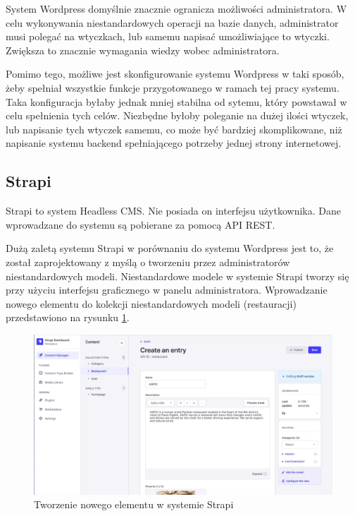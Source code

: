 System Wordpress domyślnie znacznie ogranicza możliwości administratora. W celu
wykonywania niestandardowych operacji na bazie danych, administrator musi
polegać na wtyczkach, lub samemu napisać umożliwiające to wtyczki. Zwiększa to
znacznie wymagania wiedzy wobec administratora.

Pomimo tego, możliwe jest skonfigurowanie systemu Wordpress w taki sposób, żeby
spełniał wszystkie funkcje przygotowanego w ramach tej pracy systemu. Taka
konfiguracja byłaby jednak mniej stabilna od sytemu, który powstawał w celu
spełnienia tych celów. Niezbędne byłoby poleganie na dużej ilości wtyczek, lub
napisanie tych wtyczek samemu, co może być bardziej skomplikowane, niż napisanie
systemu backend spełniającego potrzeby jednej strony internetowej.

\subsection{Strapi}

Strapi to system Headless CMS. Nie posiada on interfejsu użytkownika. Dane
wprowadzane do systemu są pobierane za pomocą API REST.

Dużą zaletą systemu Strapi w porównaniu do systemu Wordpress jest to, że został
zaprojektowany z myślą o tworzeniu przez administratorów niestandardowych
modeli. Niestandardowe modele w systemie Strapi tworzy się przy użyciu
interfejsu graficznego w panelu administratora. Wprowadzanie nowego elementu do
kolekcji niestandardowych modeli (restauracji) przedstawiono na rysunku
\ref{strapiNewEntry}.

\begin{figure}[h]
    \centering
    \includegraphics[width=1\textwidth]{./img/strapi_new_entry.png}
    \caption{Tworzenie nowego elementu w systemie Strapi}
    \label{strapiNewEntry}
\end{figure}

